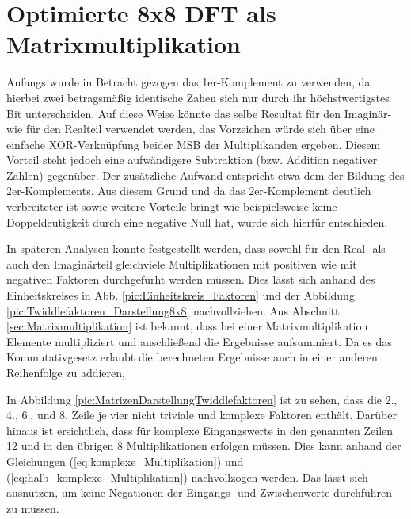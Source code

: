 \section{Optimierte 8x8 DFT als Matrixmultiplikation}\label{sec:OptimierteMatrixmultiplikation}
Anfangs wurde in Betracht gezogen das 1er-Komplement zu verwenden, da hierbei zwei betragsmäßig identische Zahen sich nur durch ihr höchstwertigstes 
 Bit unterscheiden. Auf diese Weise könnte das selbe Resultat für den Imaginär- wie für den Realteil verwendet werden, das Vorzeichen würde sich über eine 
 einfache XOR-Verknüpfung beider MSB der Multiplikanden ergeben.
 Diesem Vorteil steht jedoch eine aufwändigere Subtraktion (bzw. Addition negativer Zahlen) gegenüber. Der zusätzliche Aufwand entspricht 
 etwa dem der Bildung des 2er-Komplements. Aus diesem Grund und da das 2er-Komplement deutlich verbreiteter ist sowie weitere Vorteile bringt wie 
 beispielsweise keine Doppeldeutigkeit durch eine negative Null hat, wurde sich hierfür entschieden.
 
 
 In späteren Analysen konnte festgestellt werden, dass sowohl für den Real- als auch den Imaginärteil gleichviele Multiplikationen mit positiven wie mit negativen Faktoren 
 durchgefürht werden müssen. Dies lässt sich anhand des Einheitskreises in Abb. \ref{pic:Einheitskreis_Faktoren} und der Abbildung \ref{pic:Twiddlefaktoren_Darstellung8x8}
 nachvollziehen. Aus Abschnitt \ref{sec:Matrixmultiplikation} ist bekannt, dass bei einer Matrixmultiplikation Elemente multipliziert und anschließend die Ergebnisse 
 aufsummiert. Da es das Kommutativgesetz erlaubt die berechneten Ergebnisse auch in einer anderen Reihenfolge zu addieren, 

 
   
 In Abbildung \ref{pic:MatrizenDarstellungTwiddlefaktoren} ist zu sehen, dass die 2., 4., 6., und 8. Zeile je vier nicht triviale und komplexe Faktoren enthält. 
 Darüber hinaus ist ersichtlich, dass für komplexe Eingangswerte in den genannten Zeilen 12 und in den übrigen 8 Multiplikationen erfolgen müssen. Dies kann anhand der 
 Gleichungen (\ref{eq:komplexe_Multiplikation}) und (\ref{eq:halb_komplexe_Multiplikation}) nachvollzogen werden.
 Das lässt sich ausnutzen, um keine Negationen der Eingangs- und Zwischenwerte durchführen zu müssen. 
 

